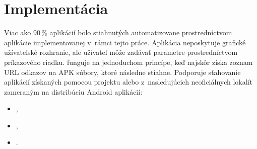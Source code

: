\section{Implementácia}
Viac ako 90\,\% aplikácií bolo stiahnutých automatizovane prostredníctvom aplikácie  implementovanej v~rámci tejto práce. Aplikácia neposkytuje grafické užívateľské rozhranie, ale užívateľ môže zadávať parametre prostredníctvom príkazového riadku.  funguje na jednoduchom princípe, keď najskôr získa zoznam URL odkazov na APK súbory, ktoré následne stiahne. Podporuje sťahovanie aplikácií získaných pomocou projektu  alebo z~nasledujúcich neoficiálnych lokalít zameraným na distribúciu Android aplikácií: 
\begin{itemize}
 \item {},
 \item {},
 \item {}.
\end{itemize}


